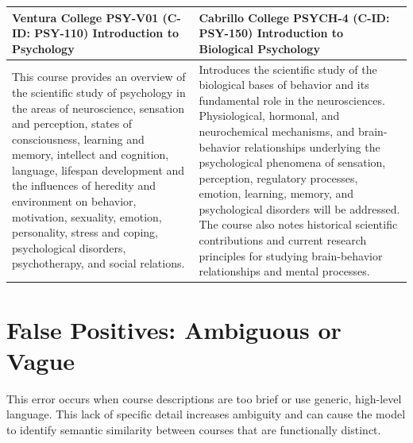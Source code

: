 {\begin{longtable}{ >{\baselineskip=12pt}p{} >{\baselineskip=12pt}p{} }
\bottomrule\toprule
Ventura College \newline PSY-V01 (C-ID: PSY-110) \newline Introduction to Psychology & Cabrillo College \newline PSYCH-4 (C-ID: PSY-150) \newline Introduction to Biological Psychology \\
\midrule
This course provides an overview of the scientific study of psychology in the areas of neuroscience, sensation and perception, states of consciousness, learning and memory, intellect and cognition, language, lifespan development and the influences of heredity and environment on behavior, motivation, sexuality, emotion, personality, stress and coping, psychological disorders, psychotherapy, and social relations. & Introduces the scientific study of the biological bases of behavior and its fundamental role in the neurosciences. Physiological, hormonal, and neurochemical mechanisms, and brain-behavior relationships underlying the psychological phenomena of sensation, perception, regulatory processes, emotion, learning, memory, and psychological disorders will be addressed. The course also notes historical scientific contributions and current research principles for studying brain-behavior relationships and mental processes. \\
\bottomrule\toprule
\end{longtable}
}

\section{False Positives: Ambiguous or Vague}\label{app:fpvague}
This error occurs when course descriptions are too brief or use generic, high-level language. This lack of specific detail increases ambiguity and can cause the model to identify semantic similarity between courses that are functionally distinct.

